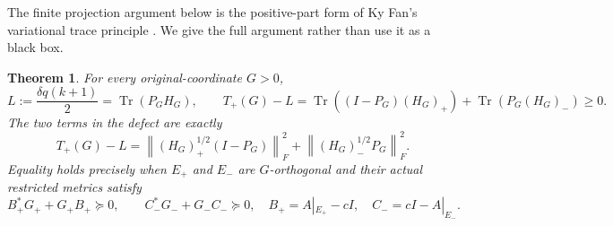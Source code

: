 \documentclass[11pt,a4paper]{article}
\newtheorem{theorem}{Theorem}[section]
\providecommand{\Tr}{\operatorname{Tr}}
\providecommand{\norm}[1]{\left\lVert#1\right\rVert}
\begin{document}
The finite projection argument below is the positive-part form of
Ky Fan's variational trace principle \cite{a03pt:fan}. We give the full
argument rather than use it as a black box.

\begin{theorem}
For every original-coordinate \(G>0\),
\begin{equation}\tag{PT7}
 L:=\frac{\delta q(k+1)}2=\Tr(P_GH_G),\qquad
 T_+(G)-L
 =\Tr((I-P_G)(H_G)_+)+\Tr(P_G(H_G)_-)\ge0.
\end{equation}
The two terms in the defect are exactly
\begin{equation}\tag{PT8}
 T_+(G)-L
 =\norm{(H_G)_+^{1/2}(I-P_G)}_F^2
   +\norm{(H_G)_-^{1/2}P_G}_F^2.
\end{equation}
Equality holds precisely when \(E_+\) and \(E_-\) are
\(G\)-orthogonal and their actual restricted metrics satisfy
\begin{equation}\tag{PT9}
 B_+^*G_++G_+B_+\succeq0,\qquad
 C_-^*G_-+G_-C_-\succeq0,
 \quad B_+=A|_{E_+}-cI,\quad C_-=cI-A|_{E_-}.
\end{equation}
\end{theorem}
\end{document}
